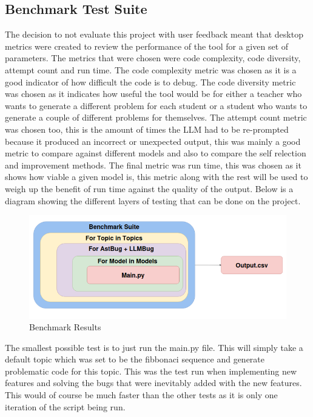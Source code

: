 \documentclass[12pt]{extarticle}
\begin{document}
\subsection{Benchmark Test Suite}

The decision to not evaluate this project with user feedback meant that desktop metrics were created to review the performance of the tool for a given set of parameters. The metrics that were chosen were code complexity, code diversity, attempt count and run time. The code complexity metric was chosen as it is a good indicator of how difficult the code is to debug. The code diversity metric was chosen as it indicates how useful the tool would be for either a teacher who wants to generate a different problem for each student or a student who wants to generate a couple of different problems for themselves. The attempt count metric was chosen too, this is the amount of times the LLM had to be re-prompted because it produced an incorrect or unexpected output, this was mainly a good metric to compare against different models and also to compare the self relection and improvement methods. The final metric was run time, this was chosen as it shows how viable a given model is, this metric along with the rest will be used to weigh up the benefit of run time against the quality of the output. Below is a diagram showing the different layers of testing that can be done on the project.

\begin{figure}[h!]
\centering
\includegraphics[width=\linewidth]{Images/Benchmark.png}
\caption{Benchmark Results}
\label{fig:benchmark_results}
\end{figure}

The smallest possible test is to just run the main.py file. This will simply take a default topic which was set to be the fibbonaci sequence and generate problematic code for this topic. This was the test run when implementing new features and solving the bugs that were inevitably added with the new features. This would of course be much faster than the other tests as it is only one iteration of the script being run.
\end{document}
